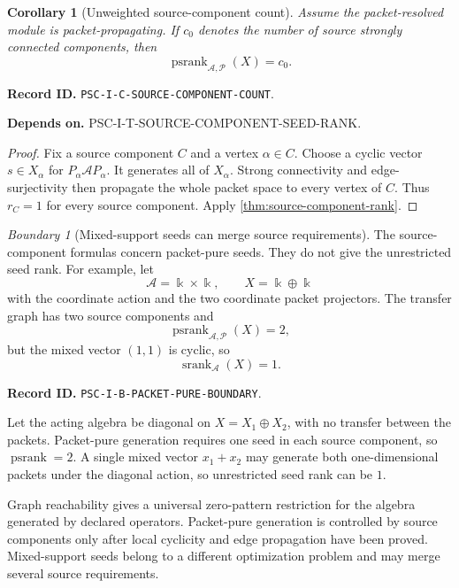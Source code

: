 \documentclass[11pt]{article}
\newtheorem{corollary}[corollary]{Corollary}
\theoremstyle{definition}
\theoremstyle{remark}
\newtheorem{boundary}[boundary]{Boundary}
\newcommand{\bbk}{\Bbbk}
\newcommand{\A}{\mathcal A}
\newcommand{\Pcal}{\mathcal P}
\newcommand{\srank}{\operatorname{srank}}
\newcommand{\psrank}{\operatorname{psrank}}
\newcommand{\RecordID}[1]{\par\smallskip\noindent\begingroup\footnotesize\color{PSCGray}\raggedright\textbf{Record ID.} \nolinkurl{#1}.\par\endgroup}
\newcommand{\Depends}[1]{\par\noindent\begingroup\footnotesize\color{PSCGray}\raggedright\textbf{Depends on.} #1\par\endgroup}
\begin{document}
\begin{corollary}[Unweighted source-component count]
\label{cor:source-component-count}
Assume the packet-resolved module is packet-propagating.  If $c_0$ denotes the number of source strongly connected components, then
\[
\boxed{
\psrank_{\A,\Pcal}(X)=c_0.
}
\]
\end{corollary}
\RecordID{PSC-I-C-SOURCE-COMPONENT-COUNT}
\Depends{PSC-I-T-SOURCE-COMPONENT-SEED-RANK.}

\begin{proof}
Fix a source component $C$ and a vertex $\alpha\in C$.  Choose a cyclic vector $s\in X_\alpha$ for $P_\alpha\A P_\alpha$.  It generates all of $X_\alpha$.  Strong connectivity and edge-surjectivity then propagate the whole packet space to every vertex of $C$.  Thus $r_C=1$ for every source component.  Apply \cref{thm:source-component-rank}.
\end{proof}

\begin{boundary}[Mixed-support seeds can merge source requirements]
\label{bnd:packet-pure-boundary}
The source-component formulas concern packet-pure seeds.  They do not give the unrestricted seed rank.  For example, let
\[
\A=\bbk\times\bbk,
\qquad
X=\bbk\oplus\bbk
\]
with the coordinate action and the two coordinate packet projectors.  The transfer graph has two source components and
\[
\psrank_{\A,\Pcal}(X)=2,
\]
but the mixed vector $(1,1)$ is cyclic, so
\[
\srank_\A(X)=1.
\]
\end{boundary}
\RecordID{PSC-I-B-PACKET-PURE-BOUNDARY}

\begin{microexample}[title={Why mixed seeds change the answer}]
Let the acting algebra be diagonal on \(X=X_1\oplus X_2\), with no transfer between the packets.  Packet-pure generation requires one seed in each source component, so \(\psrank=2\).  A single mixed vector \(x_1+x_2\) may generate both one-dimensional packets under the diagonal action, so unrestricted seed rank can be \(1\).
\end{microexample}

\begin{sectionrecap}
Graph reachability gives a universal zero-pattern restriction for the algebra generated by declared operators.  Packet-pure generation is controlled by source components only after local cyclicity and edge propagation have been proved.  Mixed-support seeds belong to a different optimization problem and may merge several source requirements.
\end{sectionrecap}
\end{document}
